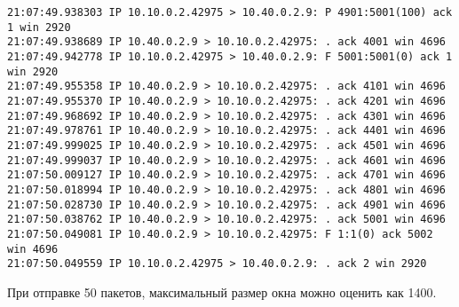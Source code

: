 \documentclass[a4paper,12pt]{article}
\begin{document}
\begin{Verbatim}
21:07:49.938303 IP 10.10.0.2.42975 > 10.40.0.2.9: P 4901:5001(100) ack 1 win 2920 
21:07:49.938689 IP 10.40.0.2.9 > 10.10.0.2.42975: . ack 4001 win 4696 
21:07:49.942778 IP 10.10.0.2.42975 > 10.40.0.2.9: F 5001:5001(0) ack 1 win 2920 
21:07:49.955358 IP 10.40.0.2.9 > 10.10.0.2.42975: . ack 4101 win 4696 
21:07:49.955370 IP 10.40.0.2.9 > 10.10.0.2.42975: . ack 4201 win 4696 
21:07:49.968692 IP 10.40.0.2.9 > 10.10.0.2.42975: . ack 4301 win 4696 
21:07:49.978761 IP 10.40.0.2.9 > 10.10.0.2.42975: . ack 4401 win 4696 
21:07:49.999025 IP 10.40.0.2.9 > 10.10.0.2.42975: . ack 4501 win 4696 
21:07:49.999037 IP 10.40.0.2.9 > 10.10.0.2.42975: . ack 4601 win 4696 
21:07:50.009127 IP 10.40.0.2.9 > 10.10.0.2.42975: . ack 4701 win 4696 
21:07:50.018994 IP 10.40.0.2.9 > 10.10.0.2.42975: . ack 4801 win 4696 
21:07:50.028730 IP 10.40.0.2.9 > 10.10.0.2.42975: . ack 4901 win 4696 
21:07:50.038762 IP 10.40.0.2.9 > 10.10.0.2.42975: . ack 5001 win 4696 
21:07:50.049081 IP 10.40.0.2.9 > 10.10.0.2.42975: F 1:1(0) ack 5002 win 4696 
21:07:50.049559 IP 10.10.0.2.42975 > 10.40.0.2.9: . ack 2 win 2920 
\end{Verbatim}

При отправке 50 пакетов, максимальный размер окна можно оценить как 1400.
\end{document}
